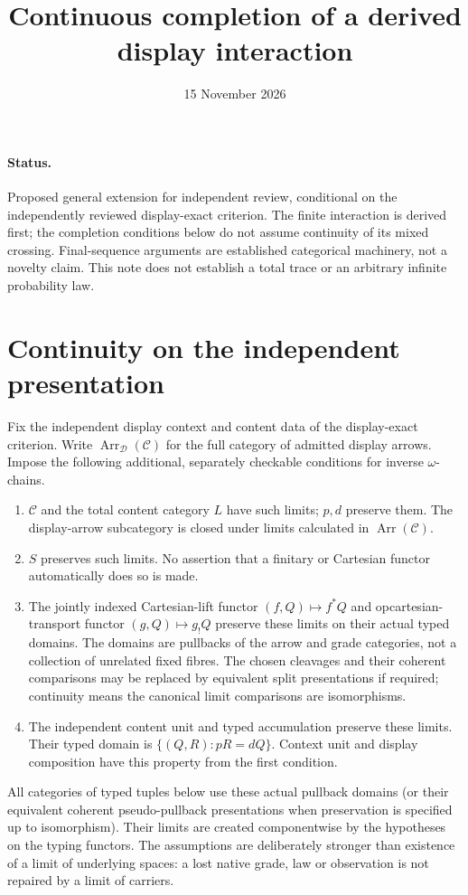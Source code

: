 \documentclass[11pt]{article}
\title{Continuous completion of a derived display interaction}
\date{15 November 2026}
\begin{document}
\maketitle
\paragraph{Status.} Proposed general extension for independent review, conditional on the independently reviewed display-exact criterion. The finite interaction is derived first; the completion conditions below do not assume continuity of its mixed crossing. Final-sequence arguments are established categorical machinery, not a novelty claim. This note does not establish a total trace or an arbitrary infinite probability law.

\section{Continuity on the independent presentation}
Fix the independent display context and content data of the display-exact criterion. Write $\operatorname{Arr}_{\mathcal D}(\mathcal C)$ for the full category of admitted display arrows. Impose the following additional, separately checkable conditions for inverse $\omega$-chains.
\begin{enumerate}
\item $\mathcal C$ and the total content category $L$ have such limits; $p,d$ preserve them. The display-arrow subcategory is closed under limits calculated in $\operatorname{Arr}(\mathcal C)$.
\item $S$ preserves such limits. No assertion that a finitary or Cartesian functor automatically does so is made.
\item The jointly indexed Cartesian-lift functor $(f,Q)\mapsto f^*Q$ and opcartesian-transport functor $(g,Q)\mapsto g_!Q$ preserve these limits on their actual typed domains. The domains are pullbacks of the arrow and grade categories, not a collection of unrelated fixed fibres. The chosen cleavages and their coherent comparisons may be replaced by equivalent split presentations if required; continuity means the canonical limit comparisons are isomorphisms.
\item The independent content unit and typed accumulation preserve these limits. Their typed domain is $\{(Q,R):pR=dQ\}$. Context unit and display composition have this property from the first condition.
\end{enumerate}
All categories of typed tuples below use these actual pullback domains (or their equivalent coherent pseudo-pullback presentations when preservation is specified up to isomorphism). Their limits are created componentwise by the hypotheses on the typing functors. The assumptions are deliberately stronger than existence of a limit of underlying spaces: a lost native grade, law or observation is not repaired by a limit of carriers.
\end{document}
